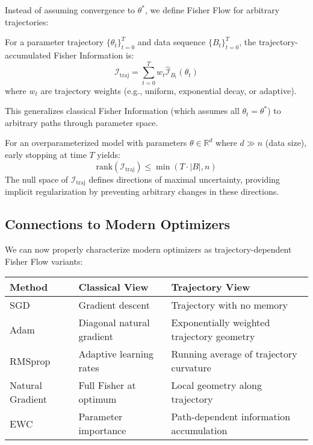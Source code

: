\documentclass[11pt]{article}
\begin{document}
Instead of assuming convergence to $\theta^*$, we define Fisher Flow for arbitrary trajectories:

\begin{definition}
For a parameter trajectory $\{\theta_t\}_{t=0}^T$ and data sequence $\{B_t\}_{t=0}^T$, the trajectory-accumulated Fisher Information is:
\begin{equation}
\mathcal{I}_{\text{traj}} = \sum_{t=0}^T w_t \hat{\mathcal{I}}_{B_t}(\theta_t)
\end{equation}
where $w_t$ are trajectory weights (e.g., uniform, exponential decay, or adaptive).
\end{definition}

This generalizes classical Fisher Information (which assumes all $\theta_t = \theta^*$) to arbitrary paths through parameter space.

\begin{theorem}
For an overparameterized model with parameters $\theta \in \mathbb{R}^d$ where $d \gg n$ (data size), early stopping at time $T$ yields:
\begin{equation}
\text{rank}(\mathcal{I}_{\text{traj}}) \leq \min(T \cdot |B|, n)
\end{equation}
The null space of $\mathcal{I}_{\text{traj}}$ defines directions of maximal uncertainty, providing implicit regularization by preventing arbitrary changes in these directions.
\end{theorem}

\subsection*{Connections to Modern Optimizers}

We can now properly characterize modern optimizers as trajectory-dependent Fisher Flow variants:

\begin{table}[h]
\centering
\begin{tabular}{lll}
\toprule
\textbf{Method} & \textbf{Classical View} & \textbf{Trajectory View} \\
\midrule
SGD & Gradient descent & Trajectory with no memory \\
Adam & Diagonal natural gradient & Exponentially weighted trajectory geometry \\
RMSprop & Adaptive learning rates & Running average of trajectory curvature \\
Natural Gradient & Full Fisher at optimum & Local geometry along trajectory \\
EWC & Parameter importance & Path-dependent information accumulation \\
\bottomrule
\end{tabular}
\end{table}
\end{document}
